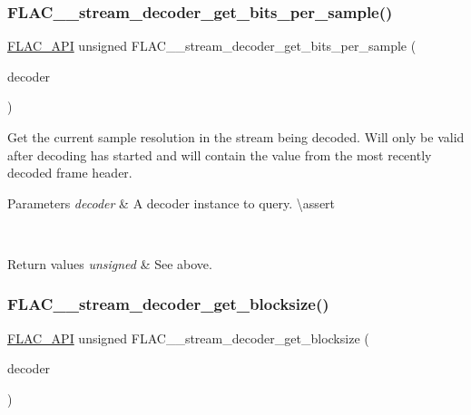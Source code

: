 \subsubsection{\texorpdfstring{FLAC\_\_stream\_decoder\_get\_bits\_per\_sample()}{FLAC\_\_stream\_decoder\_get\_bits\_per\_sample()}}
{\footnotesize\ttfamily \mbox{\hyperlink{group__flac__export_ga56ca07df8a23310707732b1c0007d6f5}{F\+L\+A\+C\+\_\+\+A\+PI}} unsigned F\+L\+A\+C\+\_\+\+\_\+stream\+\_\+decoder\+\_\+get\+\_\+bits\+\_\+per\+\_\+sample (\begin{DoxyParamCaption}\item[{const \mbox{\hyperlink{struct_f_l_a_c_____stream_decoder}{F\+L\+A\+C\+\_\+\+\_\+\+Stream\+Decoder}} $\ast$}]{decoder }\end{DoxyParamCaption})}

Get the current sample resolution in the stream being decoded. Will only be valid after decoding has started and will contain the value from the most recently decoded frame header.


\begin{DoxyParams}{Parameters}
{\em decoder} & A decoder instance to query. \textbackslash{}assert 
\begin{DoxyCode}{1}
\end{DoxyCode}
 \\
\hline
\end{DoxyParams}

\begin{DoxyRetVals}{Return values}
{\em unsigned} & See above. \\
\hline
\end{DoxyRetVals}
\mbox{\label{group__flac__stream__decoder_ga9cd4807f4c6ee90338d271048fb28223}} 
\subsubsection{\texorpdfstring{FLAC\_\_stream\_decoder\_get\_blocksize()}{FLAC\_\_stream\_decoder\_get\_blocksize()}}
{\footnotesize\ttfamily \mbox{\hyperlink{group__flac__export_ga56ca07df8a23310707732b1c0007d6f5}{F\+L\+A\+C\+\_\+\+A\+PI}} unsigned F\+L\+A\+C\+\_\+\+\_\+stream\+\_\+decoder\+\_\+get\+\_\+blocksize (\begin{DoxyParamCaption}\item[{const \mbox{\hyperlink{struct_f_l_a_c_____stream_decoder}{F\+L\+A\+C\+\_\+\+\_\+\+Stream\+Decoder}} $\ast$}]{decoder }\end{DoxyParamCaption})}

